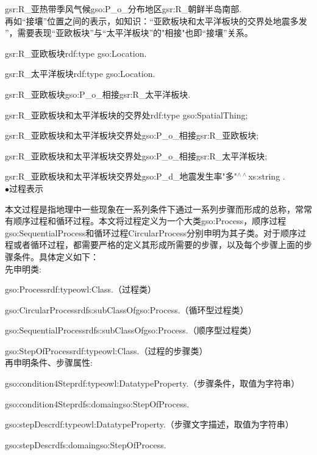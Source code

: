 gsr:R\_亚热带季风气候\quad gso:P\_o\_分布地区\quad gsr:R\_朝鲜半岛南部\quad .
\\
再如“接壤”位置之间的表示，如知识：“亚欧板块和太平洋板块的交界处地震多发
”，需要表现“亚欧板块”与“太平洋板块”的"相接"也即“接壤”关系。

gsr:R\_亚欧板块\quad rdf:type \quad gso:Location\quad .

gsr:R\_太平洋板块\quad rdf:type \quad gso:Location\quad .

gsr:R\_亚欧板块\quad gso:P\_o\_相接\quad gsr:R\_太平洋板块\quad .

gsr:R\_亚欧板块和太平洋板块的交界处\quad rdf:type \quad gso:SpatialThing\quad ;\quad 

gsr:R\_亚欧板块和太平洋板块交界处\quad gso:P\_o\_相接\quad gsr:R\_亚欧板块\quad ;

gsr:R\_亚欧板块和太平洋板块交界处\quad gso:P\_o\_相接\quad gsr:R\_太平洋板块\quad ;

gsr:R\_亚欧板块和太平洋板块交界处\quad gso:P\_d\_地震发生率\quad "多"$^{\land\land}$xs:string .
\\

$\bullet$过程表示

本文过程是指地理中一些现象在一系列条件下通过一系列步骤而形成的总称，常常有顺序过程和循环过程。本文将过程定义为一个大类gso:Process，顺序过程gso:SequentialProcess和循环过程CircularProcess分别申明为其子类。对于顺序过程或者循环过程，都需要严格的定义其形成所需要的步骤，以及每个步骤上面的步骤条件。具体定义如下：\\
先申明类:

gso:Process\quad rdf:type\quad owl:Class\quad .\quad （过程类）

gso:CircularProcess\quad rdfs:subClassOf\quad gso:Process\quad .（循环型过程类）

gso:SequentialProcess\quad rdfs:subClassOf\quad gso:Process\quad .\quad （顺序型过程类）

gso:StepOfProcess\quad rdf:type\quad owl:Class\quad .（过程的步骤类）
\\
再申明条件、步骤属性:

gso:condition4Step\quad rdf:type\quad owl:DatatypeProperty\quad .\quad （步骤条件，取值为字符串）

gso:condition4Step\quad rdfs:domain\quad gso:StepOfProcess\quad .

gso:stepDesc\quad rdf:type\quad owl:DatatypeProperty\quad .\quad （步骤文字描述，取值为字符串）

gso:stepDesc\quad rdfs:domain\quad gso:StepOfProcess\quad .

